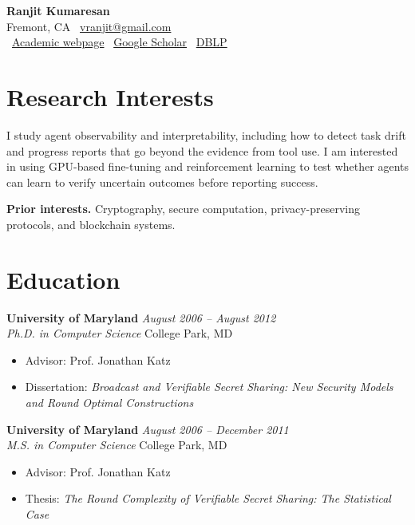 \documentclass[11pt]{article}
\newcommand{\entry}[4]{
    \vspace{1.5mm}
    \noindent\textbf{#1} \hfill \textit{#2} \\
    \noindent\textit{#3} \hfill #4 \\
}
\begin{document}
\begin{center}
    \Huge\textbf{Ranjit Kumaresan} \\
    \vspace{2mm}
    \normalsize
    Fremont, CA \quad \faEnvelope\ \href{mailto:vranjit@gmail.com}{vranjit@gmail.com} \\
    \faGlobe\ \href{https://vranjit27.github.io/}{Academic webpage} \quad
    \faGoogle\ \href{https://scholar.google.com/citations?user=YC3Ab4oAAAAJ&hl=en}{Google Scholar} \quad
    \faDatabase\ \href{https://dblp.org/pid/14/4245.html}{DBLP}
\end{center}

\vspace{-2mm}

\section{Research Interests}
I study agent observability and interpretability, including how to detect task drift and progress reports that go beyond the evidence from tool use. I am interested in using GPU-based fine-tuning and reinforcement learning to test whether agents can learn to verify uncertain outcomes before reporting success.

\textbf{Prior interests.} Cryptography, secure computation, privacy-preserving protocols, and blockchain systems.

\section{Education}
\entry{University of Maryland}{August 2006 – August 2012}{Ph.D. in Computer Science}{College Park, MD}
\begin{itemize}[leftmargin=*, noitemsep]
    \item Advisor: Prof. Jonathan Katz
    \item Dissertation: \textit{Broadcast and Verifiable Secret Sharing: New Security Models and Round Optimal Constructions}
\end{itemize}

\entry{University of Maryland}{August 2006 – December 2011}{M.S. in Computer Science}{College Park, MD}
\begin{itemize}[leftmargin=*, noitemsep]
    \item Advisor: Prof. Jonathan Katz
    \item Thesis: \textit{The Round Complexity of Verifiable Secret Sharing: The Statistical Case}
\end{itemize}
\end{document}
